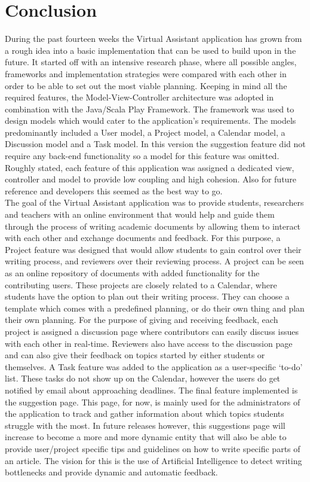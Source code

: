 \chapter{Conclusion}

During the past fourteen weeks the Virtual Assistant application has grown from a rough idea into a basic implementation that can be used to build upon in the 
future. It started off with an intensive research phase, where all possible angles, frameworks and implementation strategies were compared with each
other in order to be able to set out the most viable planning. Keeping in mind all the required features, the Model-View-Controller architecture was 
adopted in combination with the Java/Scala Play Framework.
The framework was used to design models which would cater to the application's requirements. The models predominantly included a User model, a Project 
model, a Calendar model, a Discussion model and a Task model. In this version the suggestion feature did not require any back-end functionality so a 
model for this feature was omitted. Roughly stated, each feature of this application was assigned a dedicated view, controller and model to provide low
coupling and high cohesion. Also for future reference and developers this seemed as the best way to go. \\

The goal of the Virtual Assistant application was to provide students, researchers and teachers with an online environment that would help and guide them through
the process of writing academic documents by allowing them to interact with each other and exchange documents and feedback. For this purpose, a Project
feature was designed that would allow students to gain control over their writing process, and reviewers over their reviewing process. A project can be
seen as an online repository of documents with added functionality for the contributing users. These projects are closely related to a Calendar,
where students have the option to plan out their writing process. They can choose a template which comes with a predefined planning, or do their
own thing and plan their own planning. For the purpose of giving and receiving feedback, each project is assigned a discussion page where contributors
can easily discuss issues with each other in real-time. Reviewers also have access to the discussion page and can also give their feedback on topics
started by either students or themselves. A Task feature was added to the application as a user-specific `to-do' list. These tasks do not show up
on the Calendar, however the users do get notified by email about approaching deadlines. The final feature implemented is the suggestion page. This page,
for now, is mainly used for the administrators of the application to track and gather information about which topics students struggle with the most. In 
future releases however, this suggestions page will increase to become a more and more dynamic entity that will also be able to provide user/project 
specific tips and guidelines on how to write specific parts of an article. The vision for this is the use of Artificial Intelligence to detect writing 
bottlenecks and provide dynamic and automatic feedback.